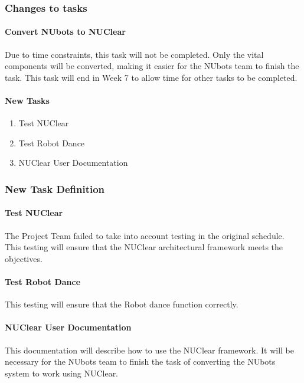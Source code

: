 \documentclass[english,12pt]{scrartcl}
\begin{document}
			\subsubsection{Changes to tasks}
				\paragraph{Convert NUbots to NUClear}
					Due to time constraints, this task will not be completed. Only the vital components will be converted, making it easier for the NUbots team to finish the task.
					This task will end in Week 7 to allow time for other tasks to be completed.
				\paragraph{New Tasks}
					\begin{enumerate}
						\item Test NUClear
						\item Test Robot Dance
						\item NUClear User Documentation
					\end{enumerate}
			\subsubsection{New Task Definition}
				\paragraph{Test NUClear}
					The Project Team failed to take into account testing in the original schedule. This testing will ensure that the NUClear architectural framework meets the objectives.
				\paragraph{Test Robot Dance}
					This testing will ensure that the Robot dance function correctly.
				\paragraph{NUClear User Documentation}
					This documentation will describe how to use the NUClear framework. It will be necessary for the NUbots team to finish the task of converting the NUbots system to work using NUClear.
\end{document}
